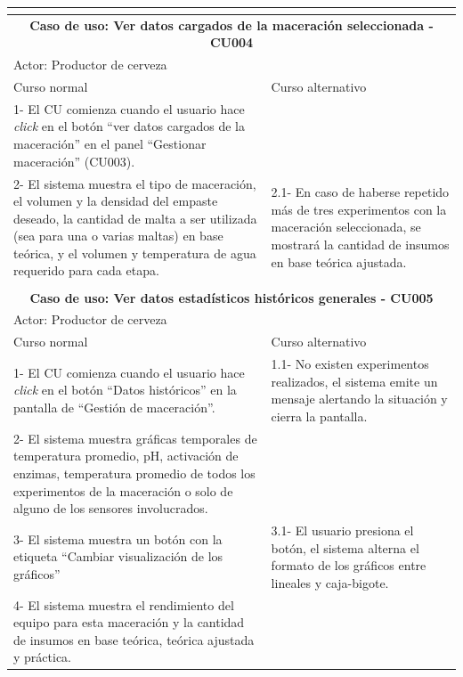 \begin{longtable}{|p{7cm}|p{7cm}|}
        \multicolumn{2}{c}{ }\\
        
        \hline
        \multicolumn{2}{|c|}{ \textbf{Caso de uso: Ver datos cargados de la maceración seleccionada - CU004}}\\
        \hline
        \multicolumn{2}{|l|}{Actor: Productor de cerveza} \\
        \hline
        Curso normal & Curso alternativo \\
        \hline
        1- El CU comienza cuando el usuario hace \textit{click} en el botón ``ver datos cargados de la maceración'' en el panel ``Gestionar maceración'' (CU003). & \\
        \hline
        2- El sistema muestra el tipo de maceración, el volumen y la densidad del empaste deseado, la cantidad de malta a ser utilizada (sea para una o varias maltas) en base teórica, y el volumen y temperatura de agua requerido para cada etapa. & 2.1- En caso de haberse repetido más de tres experimentos con la maceración seleccionada, se mostrará la cantidad de insumos en base teórica ajustada. \\
        \hline
        \multicolumn{2}{c}{ }\\
        \hline
        \multicolumn{2}{|c|}{\textbf{Caso de uso: Ver datos estadísticos históricos generales - CU005}}\\
        \hline
        \multicolumn{2}{|l|}{Actor: Productor de cerveza} \\
        \hline
        Curso normal & Curso alternativo \\
        \hline
        1- El CU comienza cuando el usuario hace \textit{click} en el botón ``Datos históricos'' en la pantalla de ``Gestión de maceración''. & 1.1- No existen experimentos realizados, el sistema emite un mensaje alertando la situación y cierra la pantalla.\\
        \hline
        2- El sistema muestra gráficas temporales de temperatura promedio, pH, activación de enzimas, temperatura promedio de todos los experimentos de la maceración o solo de alguno de los sensores involucrados. & \\
        \hline
        3- El sistema muestra un botón con la etiqueta ``Cambiar visualización de los gráficos''& 3.1- El usuario presiona el botón, el sistema alterna el formato de los gráficos entre lineales y caja-bigote. \\
        \hline
        4- El sistema muestra el rendimiento del equipo para esta maceración y la cantidad de insumos en base teórica, teórica ajustada y práctica. & \\
        \hline
        

\end{longtable}
